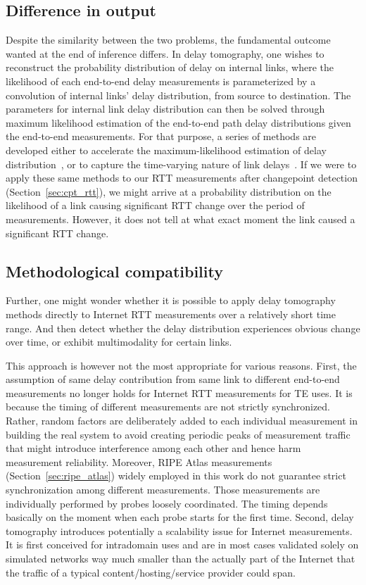 \subsection{Difference in output}
Despite the similarity between the two problems, the fundamental outcome wanted at the end of inference differs.
In delay tomography, one wishes to reconstruct the probability distribution of delay on internal links, where the likelihood of each end-to-end delay measurements is parameterized by a convolution of internal links' delay distribution, from source to destination.
The parameters for internal link delay distribution can then be solved through maximum likelihood estimation of the end-to-end path delay distributions given the end-to-end measurements.
For that purpose, a series of methods are developed either to accelerate the maximum-likelihood estimation of delay distribution~\cite{Liang2003, Tsang2003}, or to capture the time-varying nature of link delays~\cite{Shih2003,Coates2002a,Tsang2003}.
If we were to apply these same methods to our RTT measurements after changepoint detection (Section~\ref{sec:cpt_rtt}), we might arrive at a probability distribution on the likelihood of a link causing significant RTT change over the period of measurements. However, it does not tell at what exact moment the link caused a significant RTT change.

\subsection{Methodological compatibility}
Further, one might wonder whether it is possible to apply delay tomography methods directly to Internet RTT measurements over a relatively short time range. And then detect whether the delay distribution experiences obvious change over time, or exhibit multimodality for certain links.

This approach is however not the most appropriate for various reasons. First, the assumption of
same delay contribution from same link to different end-to-end measurements no longer holds for Internet RTT measurements for TE uses. It is because the timing of different measurements are not strictly synchronized. Rather, random factors are deliberately added to each individual measurement in building the real system to avoid creating periodic peaks of measurement traffic that might introduce interference among each other and hence harm measurement reliability. Moreover,  RIPE Atlas measurements (Section~\ref{sec:ripe_atlas}) widely employed in this work do not guarantee strict synchronization among different measurements.
Those measurements are individually performed by probes loosely coordinated. The timing depends basically on the moment when each probe starts for the first time.
Second, delay tomography introduces potentially a scalability issue for Internet measurements.
It is first conceived for intradomain uses and are in most cases validated solely on simulated networks way much smaller than the actually part of the Internet that the traffic of a typical content/hosting/service provider could span.

